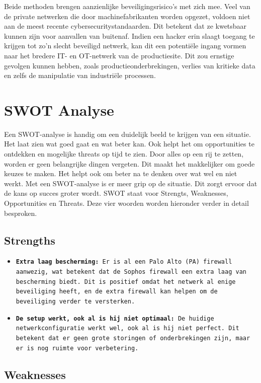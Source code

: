 Beide methoden brengen aanzienlijke beveiligingsrisico’s met zich mee. Veel van de private netwerken die door machinefabrikanten worden opgezet, voldoen niet aan de meest recente cybersecuritystandaarden. Dit betekent dat ze kwetsbaar kunnen zijn voor aanvallen van buitenaf. Indien een hacker erin slaagt toegang te krijgen tot zo’n slecht beveiligd netwerk, kan dit een potentiële ingang vormen naar het bredere IT- en OT-netwerk van de productiesite. Dit zou ernstige gevolgen kunnen hebben, zoals productieonderbrekingen, verlies van kritieke data en zelfs de manipulatie van industriële processen.




\section{SWOT Analyse}
Een SWOT-analyse is handig om een duidelijk beeld te krijgen van een situatie. Het laat zien wat goed gaat en wat beter kan. Ook helpt het om opportunities te ontdekken en mogelijke threats op tijd te zien. Door alles op een rij te zetten, worden er geen belangrijke dingen vergeten. Dit maakt het makkelijker om goede keuzes te maken. Het helpt ook om beter na te denken over wat wel en niet werkt. Met een SWOT-analyse is er meer grip op de situatie. Dit zorgt ervoor dat de kans op succes groter wordt. SWOT staat voor Strengts, Weaknesses, Opportunities en Threats. Deze vier woorden worden hieronder verder in detail besproken.


\subsection{Strengths}
\begin{itemize}
\item \texttt{\textbf{Extra laag bescherming:} Er is al een Palo Alto (PA) firewall aanwezig, wat betekent dat de Sophos firewall een extra laag van bescherming biedt. Dit is positief omdat het netwerk al enige beveiliging heeft, en de extra firewall kan helpen om de beveiliging verder te versterken.}

\item \texttt{\textbf{De setup werkt, ook al is hij niet optimaal:} De huidige netwerkconfiguratie werkt wel, ook al is hij niet perfect. Dit betekent dat er geen grote storingen of onderbrekingen zijn, maar er is nog ruimte voor verbetering.}


\end{itemize}

\subsection{Weaknesses}

